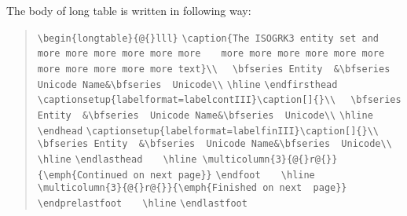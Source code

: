 The body of long table is written in following way:
\begin{quote}\obeylines\parskip0pt
\verb|\begin{longtable}{@{}lll}|
\verb|\caption{The ISOGRK3 entity set and more more more more more more|
\verb|   more more more more more more more more more more more text}\\|
\verb|  \bfseries Entity  &\bfseries  Unicode Name&\bfseries  Unicode\\|
\verb|\hline|
\verb|\endfirsthead|
\verb|\captionsetup{labelformat=labelcontIII}\caption[]{}\\|
\verb|  \bfseries Entity  &\bfseries  Unicode Name&\bfseries  Unicode\\|
\verb|\hline|
\verb|\endhead|
\verb|\captionsetup{labelformat=labelfinIII}\caption[]{}\\|
\verb|  \bfseries Entity  &\bfseries  Unicode Name&\bfseries  Unicode\\|
\verb|\hline|
\verb|\endlasthead|
\verb|   \hline \multicolumn{3}{@{}r@{}}{\emph{Continued on next page}}|
\verb|\endfoot|
\verb|   \hline \multicolumn{3}{@{}r@{}}{\emph{Finished on next  page}}|
\verb|\endprelastfoot|
\verb|   \hline|
\verb|\endlastfoot|
\end{quote}

\begingroup
{}
\let\scriptsize\tiny
\let\LTcontcaption\LTcontcaptionIII
\let\LTfincaption\LTfincaptionIII
\renewcommand\ContTable{\tablename}



\endgroup

\listoftables


\endinput 